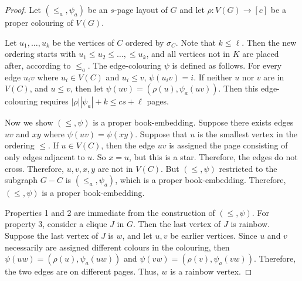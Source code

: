 \begin{proof}
	Let \((\leq_a, \psi_a)\) be an \(s\)-page layout of \(G\) and let \(\rho: V(G) \rightarrow [c]\) be a proper colouring of \(V(G)\).

	Let \(u_1, \ldots, u_k\) be the vertices of \(C\) ordered by \(\sigma_C\). Note that \(k \leq \ell\). Then the new ordering starts with \(u_1 \leq u_2 \leq \ldots, \leq u_k\), and all vertices not in \(K\) are placed after, according to \(\leq_a\).
	The edge-colouring \(\psi\) is defined as follows. For every edge \(u_i v\) where \(u_i \in V(C)\) and \(u_i \leq v\), \(\psi(u_i v) = i\). If neither \(u\) nor \(v\) are in \(V(C)\), and \(u \leq v\), then let \(\psi(uv) = (\rho(u), \psi_a(uv))\). Then this edge-colouring requires \(|\rho| |\psi_a| + k \leq cs + \ell\) pages.

	Now we show \((\leq, \psi)\) is a proper book-embedding. Suppose there exists edges \(uv\) and \(xy\) where \(\psi(uv) = \psi(xy)\). Suppose that \(u\) is the smallest vertex in the ordering \(\leq\). If \(u \in V(C)\), then the edge \(uv\) is assigned the page consisting of only edges adjacent to $u$. So \(x = u\), but this is a star. Therefore, the edges do not cross. Therefore, \(u, v, x, y\) are not in \(V(C)\). But \((\leq, \psi)\) restricted to the subgraph $G - C$ is \((\leq_a, \psi_a)\), which is a proper book-embedding. Therefore, \((\leq, \psi)\) is a proper book-embedding.  

	Properties 1 and 2 are immediate from the construction of \((\leq, \psi)\). For property 3, consider a clique \(J\) in \(G\). Then the last vertex of \(J\) is rainbow. Suppose the last vertex of \(J\) is \(w\), and let \(u, v\) be earlier vertices. Since \(u\) and \(v\) necessarily are assigned different colours in the colouring, then \(\psi(uw) = (\rho(u), \psi_a(uw))\) and \(\psi(vw) = (\rho(v), \psi_a(vw))\). Therefore, the two edges are on different pages. Thus, \(w\) is a rainbow vertex.
\end{proof}


